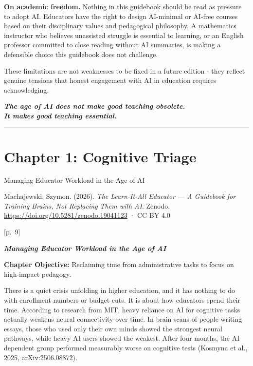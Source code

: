 \documentclass[
  letterpaper,
  DIV=11,
  numbers=noendperiod]{scrreprt}
\begin{document}
\textbf{On academic freedom.} Nothing in this guidebook should be read
as pressure to adopt AI. Educators have the right to design AI-minimal
or AI-free courses based on their disciplinary values and pedagogical
philosophy. A mathematics instructor who believes unassisted struggle is
essential to learning, or an English professor committed to close
reading without AI summaries, is making a defensible choice this
guidebook does not challenge.

These limitations are not weaknesses to be fixed in a future edition -
they reflect genuine tensions that honest engagement with AI in
education requires acknowledging.

\textbf{\emph{The age of AI does not make good teaching obsolete.}}\\
\textbf{\emph{It makes good teaching essential.}}

\begin{center}\rule{0.5\linewidth}{0.5pt}\end{center}


\chapter{Chapter 1: Cognitive Triage}\label{chapter-1-cognitive-triage}

Managing Educator Workload in the Age of AI

\hfill\break

\begin{tcolorbox}[enhanced jigsaw, arc=.35mm, bottomrule=.15mm, breakable, colback=white, colframe=quarto-callout-note-color-frame, left=2mm, leftrule=.75mm, opacityback=0, rightrule=.15mm, toprule=.15mm]

Machajewski, Szymon. (2026). \emph{The Learn-It-All Educator --- A
Guidebook for Training Brains, Not Replacing Them with AI}. Zenodo.
\url{https://doi.org/10.5281/zenodo.19041123} · CC BY 4.0

\end{tcolorbox}

{[}p.~9{]}

\textbf{\emph{Managing Educator Workload in the Age of AI}}

\textbf{Chapter Objective:} Reclaiming time from administrative tasks to
focus on high-impact pedagogy.

There is a quiet crisis unfolding in higher education, and it has
nothing to do with enrollment numbers or budget cuts. It is about how
educators spend their time. According to research from MIT, heavy
reliance on AI for cognitive tasks actually weakens neural connectivity
over time. In brain scans of people writing essays, those who used only
their own minds showed the strongest neural pathways, while heavy AI
users showed the weakest. After four months, the AI-dependent group
performed measurably worse on cognitive tests (Kosmyna et al., 2025,
arXiv:2506.08872).
\end{document}
